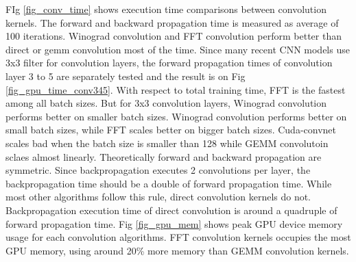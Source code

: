 FIg \ref{fig_conv_time} shows execution time comparisons between convolution kernels.
The forward and backward propagation time is measured as average of 100 iterations.
Winograd convolution and FFT convolution perform better than direct or gemm convolution most of the time.
Since many recent CNN models use 3x3 filter for convolution layers\cite{vgg}, the forward propagation times of convolution layer 3 to 5 are separately tested and the result is on Fig \ref{fig_gpu_time_conv345}.
With respect to total training time, FFT is the fastest among all batch sizes.
But for 3x3 convolution layers, Winograd convolution performs better on smaller batch sizes.
Winograd convolution performs better on small batch sizes, while FFT scales better on bigger batch sizes.
Cuda-convnet scales bad when the batch size is smaller than 128 while GEMM convolutoin sclaes almost linearly.
Theoretically forward and backward propagation are symmetric.
Since backpropagation executes 2 convolutions per layer, the backpropagation time should be a double of forward propagation time.
While most other algorithms follow this rule, direct convolution kernels do not.
Backpropagation execution time of direct convolution is around a quadruple of forward propagation time.
Fig \ref{fig_gpu_mem} shows peak GPU device memory usage for each convolution algorithms.
FFT convolution kernels occupies the most GPU memory, using around 20\% more memory than GEMM convolution kernels.

